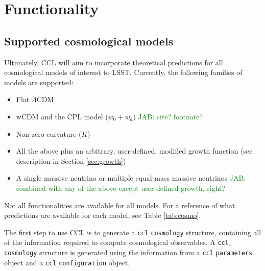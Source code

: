 \documentclass[\docopts]{\docclass}
\newcommand{\jab}[1]{\textcolor{green}{JAB: #1}}
\begin{document}
\section{Functionality}
\label{sec:func}

\subsection{Supported cosmological models}


\label{sec:cosmologies}
Ultimately, CCL will aim to incorporate theoretical predictions for all cosmological models of interest to LSST. Currently, the following families of models are supported:
\begin{itemize}
 \item Flat $\Lambda$CDM 
 \item wCDM and the CPL model ($w_0+w_a$) \jab{cite? footnote?}
 \item Non-zero curvature ($K$)
 \item All the above plus an arbitrary, user-defined, modified growth function (see description in Section \ref{sec:growth})
  \item A single massive neutrino or multiple equal-mass massive neutrinos \jab{combined with any of the above except user-defined growth, right?}
\end{itemize}

Not all functionalities are available for all models. For a reference of what predictions are available for each model, see Table \ref{tab:cosmo}.

The first step to use CCL is to generate a {\tt ccl$\_$cosmology} structure, containing all of the information required to compute cosmological observables. A {\tt ccl$\_$cosmology} structure is generated using the information from a {\tt ccl$\_$parameters} object and a {\tt ccl$\_$configuration} object.


\end{document}
